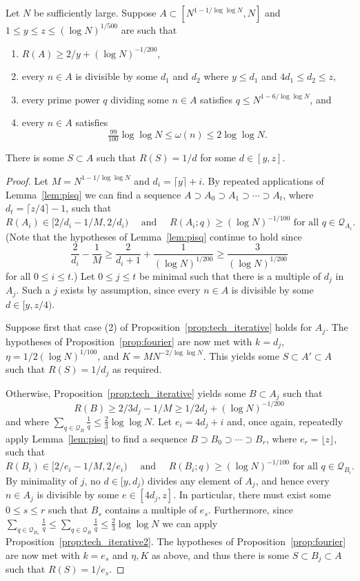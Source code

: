 \begin{proposition}\label{prop:techmain}
\leanok
{}
Let $N$ be sufficiently large. Suppose $A\subset [N^{1-1/\log\log N},N]$ and $1\leq y\leq z\leq (\log N)^{1/500}$ are such that
\begin{enumerate}
\item $R(A)\geq 2/y+(\log N)^{-1/200}$,
\item every $n\in A$ is divisible by some $d_1$ and $d_2$ where $y\leq d_1$ and $4d_1\leq d_2\leq z$,
\item every prime power $q$ dividing some $n\in A$ satisfies $q\leq N^{1-6/\log\log N}$, and
\item every $n\in A$ satisfies
\[\tfrac{99}{100}\log\log N\leq \omega(n) \leq 2\log\log N.\]
\end{enumerate}
There is some $S\subset A$ such that $R(S)=1/d$ for some $d\in [y,z]$.
\end{proposition}
\begin{proof}
Let $M=N^{1-1/\log\log N}$ and $d_i = \lceil y \rceil +i$. By repeated applications of Lemma~\ref{lem:pisq} we can find a sequence $A\supset A_0\supset A_1\supset\cdots \supset A_{t}$, where $d_t=\lceil z/4\rceil-1$, such that
\[R(A_i)\in [2/d_i-1/M,2/d_i)\quad\textrm{ and }\quad R(A_i;q)\geq (\log N)^{-1/100}\textrm{ for all }q\in \mathcal{Q}_{A_i}.\]
(Note that the hypotheses of Lemma~\ref{lem:pisq} continue to hold since
\[\frac{2}{d_i}-\frac{1}{M}\geq \frac{2}{d_{i}+1}+\frac{1}{(\log N)^{1/200}}\geq \frac{3}{(\log N)^{1/200}}\]
for all $0\leq i\leq t$.) Let $0\leq j\leq t$ be minimal such that there is a multiple of $d_j$ in $A_j$. Such a $j$ exists by assumption, since every $n\in A$ is divisible by some $d\in[y,z/4)$.

Suppose first that case (2) of Proposition~\ref{prop:tech_iterative} holds for $A_j$. The hypotheses of Proposition~\ref{prop:fourier} are now met with $k=d_j$, $\eta=1/2(\log N)^{1/100}$, and $K=MN^{-2/\log \log N}$. This yields some $S\subset A'\subset A$ such that $R(S)=1/d_j$ as required.

Otherwise, Proposition~\ref{prop:tech_iterative} yields some $B\subset A_j$ such that
\[R(B)\geq 2/3d_j-1/M\geq 1/2d_j+(\log N)^{-1/200}\]
and where $\sum_{q\in\mathcal{Q}_B}\frac{1}{q}\leq \frac{2}{3}\log\log N$. Let $e_i = 4d_j+i$ and, once again, repeatedly apply Lemma~\ref{lem:pisq} to find a sequence $B\supset B_0\supset \cdots\supset B_r$, where $e_r=\lfloor z\rfloor$, such that
\[R(B_i)\in [2/e_i-1/M,2/e_i)\quad\textrm{ and }\quad R(B_i;q)\geq (\log N)^{-1/100}\textrm{ for all }q\in \mathcal{Q}_{B_i}.\]
By minimality of $j$, no $d\in [y,d_j)$ divides any element of $A_j$, and hence every $n\in A_j$ is divisible by some $e\in [4d_j,z]$. In particular, there must exist some $0\leq s\leq r$ such that $B_s$ contains a multiple of $e_s$. Furthermore, since $\sum_{q\in \mathcal{Q}_{B_s}}\frac{1}{q}\leq \sum_{q\in\mathcal{Q}_B}\frac{1}{q}\leq \frac{2}{3}\log\log N$ we can apply Proposition~\ref{prop:tech_iterative2}. The hypotheses of Proposition~\ref{prop:fourier} are now met with $k=e_s$ and $\eta,K$ as above, and thus there is some $S\subset B_j\subset A$ such that $R(S)=1/e_s$.
\end{proof}

